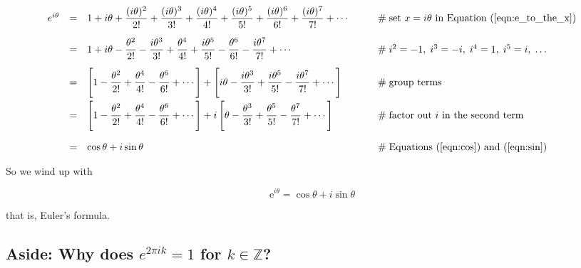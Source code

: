\documentclass{article}
\theoremstyle{definition}
\begin{document}
\bigskip
\begin{equation*}
\begin{array}{lllll}
e^{i\theta}
&=& {\displaystyle 1 + i\theta +  \frac{(i\theta)^2}{2!} +
                   \frac{(i\theta)^3}{3!} + \frac{(i\theta)^4}{4!} +
                   \frac{(i\theta)^5}{5!} + \frac{(i\theta)^6}{6!} +
                   \frac{(i\theta)^7}{7!} + \cdots}    
        &\qquad \mathrel{\#} \text{set $x = i\theta$ in Equation (\ref{eqn:e_to_the_x})}  \\
[13pt]
&=& {\displaystyle 1 +  i\theta -  \frac{\theta^2}{2!} -  \frac{i
                   \theta^3}{3!} + \frac{\theta^4}{4!}  + \frac{i \theta^5}{5!} -
                   \frac{\theta^6}{6!} - \frac{i \theta^7}{7!}  + \cdots}
        &\qquad \mathrel{\#} i^2 = -1, \;  i^3 = -i, \; i^4 = 1, \;  i^5 = i, \; \hdots \\
[12pt]
&=& {\displaystyle \left [ 1 -  \frac{\theta^2}{2!}  +
                   \frac{\theta^4}{4!} - \frac{\theta^6}{6!} + \cdots  \right ]+
                   \left [ i\theta  - \frac{i \theta^3}{3!} + \frac{i \theta^5}{5!}
                   - \frac{i \theta^7}{7!} + \cdots \right ]}                  
        &\qquad \mathrel{\#} \text{group terms} \\
[12pt]
&=& {\displaystyle  \left [ 1 -  \frac{\theta^2}{2!}  +
                    \frac{\theta^4}{4!} - \frac{\theta^6}{6!} +
                    \cdots  \right ]+ i \left [ \theta  -
                    \frac{\theta^3}{3!} + \frac{\theta^5}{5!} -
                    \frac{\theta^7}{7!} + \cdots \right ]}                   
        &\qquad \mathrel{\#} \text{factor out $i$ in the second term} \\
[20pt]
&=& {\displaystyle \cos \theta + i \sin \theta}
        &\qquad \mathrel{\#} \text{Equations (\ref{eqn:cos}) and (\ref{eqn:sin})}
\end{array}
\end{equation*}

\bigskip
\noindent
So we wind up with

\bigskip
\begin{equation}
\mathrm{e}^{i\theta} = \cos \theta + i \sin \theta
\label{eqn:eulers_formula}
\end{equation}

\bigskip
\noindent
that is, Euler's formula.

\subsection{Aside: Why does $e^{2\pi ik} =1$ for $k \in \mathbb{Z}$?}
\label{subsection:e_to_the_2pik_equals_one}
\end{document}
